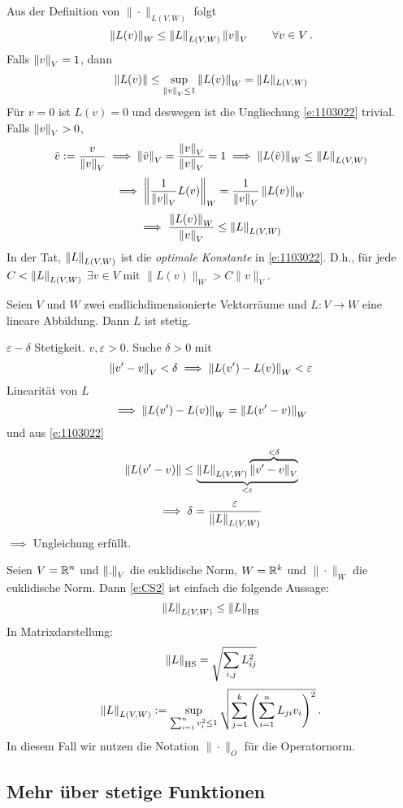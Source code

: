 
\begin{Bem}
Aus der Definition von $\|\cdot\|_{L(V,W)}$ folgt
  \begin{equation}
    \label{e:1103022}
    \left\| L(v) \right\|_W\leq\left\| L \right\|_{L(V,W)}\left\| v \right\|_V \qquad \forall v\in V\, .
  \end{equation}
  Falls $\left\| v \right\|_V=1$, dann
  \[\left\| L(v) \right\| \leq \sup_{\left\| v \right\|_V\leq 1}\left\| L(v) \right\|_W = \|L\|_{L(V,W)}\]
F\"ur $v=0$ ist $L(v)=0$ und deswegen ist die Ungliechung \eqref{e:1103022} trivial.
Falls $\left\| v \right\|_V>0$,
  \[\tilde v:=\frac{v}{\left\| v \right\|_V}\implies\left\| \tilde v \right\|_V = \frac{\left\| v \right\|_V}{\left\| v \right\|_V}=1
  \implies \left\| L(\tilde v) \right\|_W\leq \left\| L \right\|_{L(V,W)}\]
  \[\implies \left\| \frac{1}{\left\| v \right\|_V}L(v) \right\|_W=\frac{1}{\left\| v \right\|_V}\left\| L(v) \right\|_W\]
  \[\implies\frac{\left\| L(v) \right\|_W}{\left\| v \right\|_V}\leq \left\| L \right\|_{L(V,W)}\]
In der Tat,  $\left\| L \right\|_{L(V,W)}$ ist die {\em optimale Konstante} in \eqref{e:1103022}. D.h.,
f\"ur jede $C<\left\| L \right\|_{L(V,W)}$ $\exists v\in V$ mit $\|L(v)\|_W > C \|v\|_V$.
\end{Bem}
\begin{Kor}
Seien $V$ und $W$ zwei endlichdimensionierte Vektorr\"aume und $L:V\to W$ eine
lineare Abbildung. Dann $L$ ist stetig.
\end{Kor}

\begin{Bew}
  $\varepsilon-\delta$ Stetigkeit. $v,\varepsilon>0$. Suche $\delta>0$ mit
  \[\left\| v'-v \right\|_V<\delta\implies\left\| L(v')-L(v) \right\|_W<\varepsilon\]
  Linearität von $L$
  \[\implies \left\| L(v')-L(v) \right\|_W=\left\| L(v'-v) \right\|_W\]
  und aus \eqref{e:1103022}
  \[\left\| L(v'-v) \right\|\leq\underbrace{\left\| L \right\|_{L(V,W)}\overbrace{\left\| v'-v \right\|_V}^{<\delta}}_{<\varepsilon}\]
  \[\implies \delta=\frac{\varepsilon}{\left\| L \right\|_{L(V,W)}}\]
  $\implies$ Ungleichung erfüllt.
\end{Bew}
\begin{Bem} Seien
  $V=\mathbb{R}^n$ und $\left\| . \right\|_V$ die euklidische Norm, $W=\mathbb{R}^k$ und $\|\cdot\|_W$ die euklidische Norm.
Dann \eqref{e:CS2} ist einfach die folgende Aussage:  
\[\left\| L \right\|_{L(V,W)}\leq \left\| L \right\|_{\text{HS}}\]
In Matrixdarstellung:
  \[\left\| L \right\|_\text{HS}=\sqrt{\sum_{i,j}L_{ij}^2}\]
  \[\left\| L \right\|_{L(V,W)}:=\sup_{\sum^n_{i=1}v_i^2\leq 1}\sqrt{\sum^k_{j=1}\left( \sum_{i=1}^nL_{ji}v_i \right)^2}\, .\]
In diesem Fall wir nutzen die Notation $\|\cdot\|_O$ f\"ur die Operatornorm.
\end{Bem}
\subsection{Mehr über stetige Funktionen}
